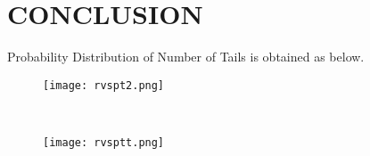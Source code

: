 \documentclass[journal,12pt,twocolumn]{IEEEtran}
\begin{document}
\section{CONCLUSION}
Probability Distribution of Number of Tails is obtained as below.\\
\begin{figure}[ht]
    \texttt{[image: rvspt2.png]}
    
\end{figure} \\
\begin{figure}[ht]
    \texttt{[image: rvsptt.png]}
    
\end{figure}
\end{document}
